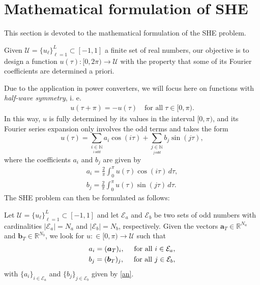 \section{Mathematical formulation of SHE}\label{Section2}

This section is devoted to the mathematical formulation of the SHE problem. 

Given $\mathcal U = \{u_\ell\}_{\ell=1}^L\subset [-1,1]$ a finite set of real numbers, our objective is to design a function $u(\tau):[0,2\pi)\to\mathcal U$ with the property that some of its Fourier coefficients are determined a priori. 

Due to the application in power converters, we will focus here on functions with \textit{half-wave symmetry}, i. e. 
\begin{align*}
	u(\tau + \pi) = -u(\tau)\quad \mbox{for all}\; \tau \in [0,\pi).
\end{align*}
In this way, $u$ is fully determined by its values in the interval $[0,\pi)$, and its Fourier series expansion only involves the odd terms and takes the form
\begin{equation}
	u(\tau ) = \sum_{\underset{i\, odd}{i \in \mathbb{N}}} a_i \cos(i\tau)+ \sum_{\underset{j\, odd}{j \in \mathbb{N}}}  b_j \sin(j \tau), 
\end{equation}
where the coefficients $a_i$ and $b_j$ are given by
\begin{equation} \label{an}
	\begin{aligned}
		a_i = \frac{2}{\pi} \int_0^\pi u(\tau ) \cos(i \tau)\,d\tau, 
		\\
		b_j = \frac{2}{\pi} \int_0^\pi u(\tau)  \sin(j \tau)\,d\tau.
	\end{aligned}
\end{equation}
The SHE problem can then be formulated as follows:
\newline
\begin{problem}[SHE]\label{SHEp}
Let $\mathcal{U} = \{u_\ell\}_{\ell=1}^L\subset [-1,1]$ and let $\mathcal{E} _a $ and $\mathcal{E} _b $ be two sets of odd numbers with cardinalities $|\mathcal{E}_a| = N_a $ and $ |\mathcal{E} _b| = N_b$, respectively. Given the vectors $\bm{a}_T \in \mathbb{R}^{N_a}$ and $\bm{b}_T \in \mathbb{R}^{N_b} $, we look for $u:\in [0,\pi)\to\mathcal{U}$ such that 
\begin{gather}
	\notag a_i = (\bm{a}_T)_i, \quad\textrm{ for all } i \in \mathcal{E}_a,
	\\
	\notag b_j = (\bm {b}_T)_j, \quad\textrm{ for all } j \in \mathcal{E}_b,
\end{gather}
with $\{a_i\}_{i\in\mathcal E_a}$ and $\{b_j\}_{j\in\mathcal E_b}$ given by \eqref{an}.
\end{problem}

